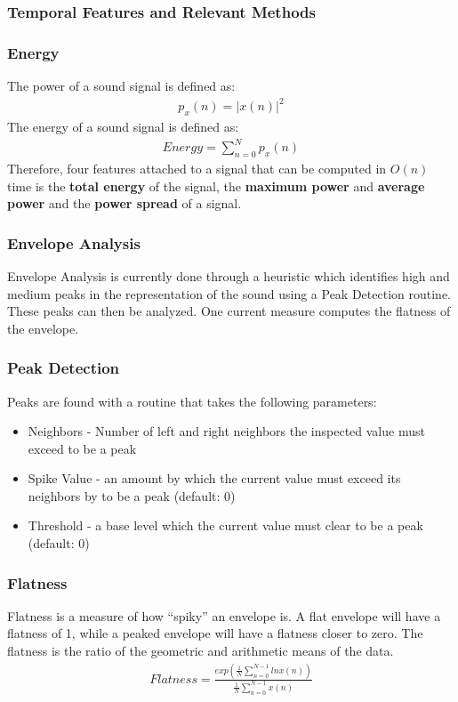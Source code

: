 \documentclass[DIV=calc, paper=a4, fontsize=11pt, twocolumn]{scrartcl}   %
\begin{document}
\subsubsection{Temporal Features and Relevant Methods}
\subsubsection {Energy}
   The power of a sound signal is defined as:
   \begin{align}
      p_x(n) = |x(n)|^2
   \end{align}
   The energy of a sound signal is defined as:
   \begin{align}
     Energy = \sum_{n=0}^N p_x(n)
   \end{align}
   Therefore, four features attached to a signal that can be computed in $O(n)$ time is the \textbf{total energy} of the signal, the \textbf{maximum power} and \textbf{average power} and the \textbf{power spread} of a signal.

   \subsubsection {Envelope Analysis}
   Envelope Analysis is currently done through a heuristic which identifies high and medium peaks in the representation of the sound using a Peak Detection routine. These peaks can then be analyzed. One current measure computes the flatness of the envelope.
    \subsubsection {Peak Detection}
    Peaks are found with a routine that takes the following parameters:
      \begin{itemize}
        \item Neighbors - Number of left and right neighbors the inspected value must exceed to be a peak
        \item Spike Value - an amount by which the current value must exceed its neighbors by to be a peak (default: 0)
        \item Threshold - a base level which the current value must clear to be a peak (default: 0)
      \end{itemize}
   \subsubsection{Flatness}
      Flatness is a measure of how ``spiky'' an envelope is. A flat envelope will have a flatness of 1, while a peaked envelope will have a flatness closer to zero. The flatness is the ratio of the geometric and arithmetic means of the data.
      \begin{align}
      Flatness = \frac{exp(\frac{1}{N}\sum_{n=0}^{N-1}lnx(n))}{\frac{1}{N}\sum_{n=0}^{N-1}x(n)}
      \end{align}
\end{document}

